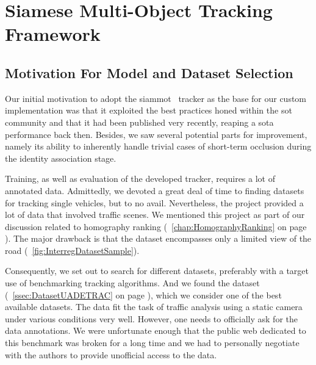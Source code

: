 \section{Siamese Multi-Object Tracking Framework}
\label{sec:SiamMOT}

\subsection{Motivation For Model and Dataset Selection}

Our initial motivation to adopt the \gls{siammot}~\cite{shuai2021siammot} tracker as the base for our custom implementation was that it exploited the best practices honed within the \gls{sot} community and that it had been published very recently, reaping a \gls{sota} performance back then. Besides, we saw several potential parts for improvement, namely its ability to inherently handle trivial cases of short-term occlusion during the identity association stage.

Training, as well as evaluation of the developed tracker, requires a lot of annotated data. Admittedly, we devoted a great deal of time to finding datasets for tracking single vehicles, but to no avail. Nevertheless, the \interreg{} project provided a lot of data that involved traffic scenes. We mentioned this project as part of our discussion related to homography ranking (\chaptertext{}~\ref{chap:HomographyRanking} on page \pageref{chap:HomographyRanking}). The major drawback is that the dataset encompasses only a limited view of the road (\figtext{}~\ref{fig:InterregDatasetSample}).

Consequently, we set out to search for different datasets, preferably with a target use of benchmarking tracking algorithms. And we found the \uadetrac{} dataset (\sectiontext{}~\ref{ssec:DatasetUADETRAC} on page \pageref{ssec:DatasetUADETRAC}), which we consider one of the best available datasets. The data fit the task of traffic analysis using a static camera under various conditions very well. However, one needs to officially ask for the data annotations. We were unfortunate enough that the public web dedicated to this benchmark was broken for a long time and we had to personally negotiate with the authors to provide unofficial access to the data.

